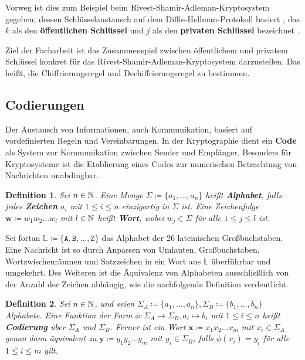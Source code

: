 \documentclass{paper}
\theoremstyle{classic}
\newtheorem{definition}{Definition}[section]
\begin{document}
Vorweg ist dies zum Beispiel beim Rivest-Shamir-Adleman-Kryptosystem gegeben, dessen Schlüsselaustausch auf dem Diffie-Hellman-Protokoll basiert \cite{pkx:1976}, das \(k\) als den \textbf{öffentlichen Schlüssel} und \(j\) als den \textbf{privaten Schlüssel} bezeichnet \cite{rsa:1977}.

Ziel der Facharbeit ist das Zusammenspiel zwischen öffentlichem und privatem Schlüssel konkret für das Rivest-Shamir-Adleman-Kryptosystem darzustellen. Das heißt, die Chiffrierungsregel und Dechiffrierungsregel zu bestimmen.

\subsection{Codierungen}

Der Austausch von Informationen, auch Kommunikation, basiert auf vordefinierten Regeln und Vereinbarungen. In der Kryptographie dient ein \textbf{Code} als System zur Kommunikation zwischen Sender und Empfänger. Besonders für Kryptosysteme ist die Etablierung eines Codes zur numerischen Betrachtung von Nachrichten unabdingbar.
\begin{definition}
\label{def:1.2}
Sei \(n \in \mathbb{N}\). Eine Menge \(\Sigma \coloneqq \{a_1,\dots,a_n\}\) heißt \textbf{Alphabet}, falls jedes \textbf{Zeichen} \(a_i\) mit \(1 \leq i \leq n\) einzigartig in \(\Sigma\) ist. Eine Zeichenfolge \(\textbf{w} \coloneqq w_1 w_2 \dots w_l\) mit \(l \in \mathbb{N}\) heißt \textbf{Wort}, wobei \(w_j \in \Sigma\) für alle \(1 \leq j \leq l\) ist.
\end{definition}
Sei fortan \(\mathbb{L} \coloneqq \{\texttt{A},\texttt{B},\dots,\texttt{Z}\}\) das Alphabet der 26 lateinischen Großbuchstaben. Eine Nachricht ist so durch Anpassen von Umlauten, Großbuchstaben, Wortzwischenräumen und Satzzeichen in ein Wort aus \(\mathbb{L}\) überführbar und umgekehrt. Des Weiteren ist die Äquivalenz von Alphabeten ausschließlich von der Anzahl der Zeichen abhängig, wie die nachfolgende Definition verdeutlicht.
\begin{definition}
\label{def:1.3}
Sei \(n \in \mathbb{N}\), und seien \(\Sigma_A \coloneqq \{a_1,\dots,a_n\},\Sigma_B \coloneqq \{b_1,\dots,b_n\}\) Alphabete. Eine Funktion der Form \(\phi : \Sigma_A \rightarrow \Sigma_B, a_i \mapsto b_i\) mit \(1 \leq i \leq n\) heißt \textbf{Codierung} über \(\Sigma_A\) und \(\Sigma_B\). Ferner ist ein Wort \(\textbf{x} \coloneqq x_1 x_2 \dots x_m\) mit \(x_i \in \Sigma_A\) genau dann äquivalent zu \(\textbf{y} \coloneqq y_1 y_2 \dots y_m\) mit \(y_i \in \Sigma_B\), falls \(\phi(x_i) = y_i\) für alle \(1 \leq i \leq m\) gilt.
\end{definition}
\end{document}
